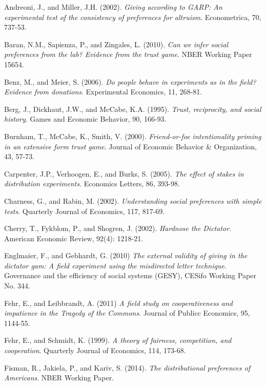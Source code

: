 \documentclass{article}
\begin{document}
\begin{thebibliography}{9}

Andreoni, J., and Miller, J.H. (2002).
\textit{Giving according to GARP: An experimental test of the consistency of preferences for altruism}.
Econometrica, 70, 737-53.

Baran, N.M., Sapienza, P., and Zingales, L. (2010).
\textit{Can we infer social preferences from the lab? Evidence from the trust game}.
NBER Working Paper 15654.

Benz, M., and Meier, S. (2006).
\textit{Do people behave in experiments as in the field? Evidence from donations}.
Experimental Economics, 11, 268-81.

Berg, J., Dickhaut, J.W., and McCabe, K.A. (1995).
\textit{Trust, reciprocity, and social history}.
Games and Economic Behavior, 90, 166-93.

Burnham, T., McCabe, K., Smith, V. (2000).
\textit{Friend-or-foe intentionality priming in an extensive form trust game}.
Journal of Economic Behavior \& Organization, 43, 57-73.

Carpenter, J.P., Verhoogen, E., and Burks, S. (2005).
\textit{The effect of stakes in distribution experiments}.
Economics Letters, 86, 393-98.

Charness, G., and Rabin, M. (2002).
\textit{Understanding social preferences with simple tests}.
Quarterly Journal of Economics, 117, 817-69.

Cherry, T., Fykblom, P., and Shogren, J. (2002).
\textit{Hardnose the Dictator}.
American Economic Review, 92(4): 1218-21.

Englmaier, F., and Gebhardt, G. (2010)
\textit{The external validity of giving in the dictator gam: A field experiment using the misdirected letter technique}.
Governance and the efficiency of social systems (GESY), CESifo Working Paper No. 344.

Fehr, E., and Leibbrandt, A. (2011)
\textit{A field study on cooperativeness and impatience in the Tragedy of the Commons}.
Journal of Publicc Economics, 95, 1144-55.

Fehr, E., and Schmidt, K. (1999).
\textit{A theory of fairness, competition, and cooperation}.
Quarterly Journal of Economics, 114, 173-68.

Fisman, R., Jakiela, P., and Kariv, S. (2014).
\textit{The distributional preferences of Americans}.
NBER Working Paper.


\end{thebibliography}
\end{document}
